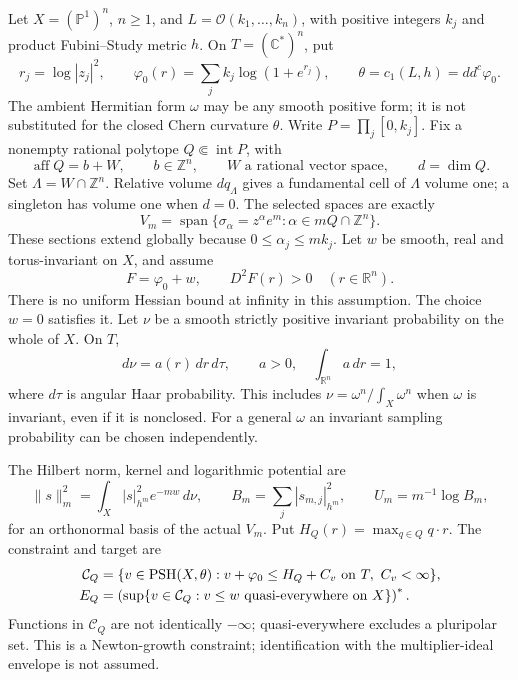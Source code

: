 \documentclass[11pt]{article}
\newcommand{\ddc}{dd^c}
\newcommand{\C}{\mathbb C}
\newcommand{\R}{\mathbb R}
\newcommand{\Z}{\mathbb Z}
\newcommand{\PSH}{\operatorname{PSH}}
\begin{document}
Let $X=(\mathbb P^1)^n$, $n\geq1$, and
$L=\mathcal O(k_1,\ldots,k_n)$, with positive integers $k_j$ and product
Fubini--Study metric $h$. On $T=(\C^*)^n$, put
\[
 r_j=\log|z_j|^2,\qquad
 \varphi_0(r)=\sum_jk_j\log(1+e^{r_j}),\qquad
 \theta=c_1(L,h)=\ddc\varphi_0.
\]
The ambient Hermitian form $\omega$ may be any smooth positive form;
it is not substituted for the closed Chern curvature $\theta$.
Write $P=\prod_j[0,k_j]$. Fix a nonempty rational polytope
$Q\Subset\operatorname{int}P$, with
\[
 \operatorname{aff}Q=b+W,\qquad b\in\Z^n,\qquad
 W\text{ a rational vector space},\qquad d=\dim Q.
\]
Set $\Lambda=W\cap\Z^n$. Relative volume $dq_\Lambda$ gives a
fundamental cell of $\Lambda$ volume one; a singleton has volume one
when $d=0$. The selected spaces are exactly
\begin{equation}\label{eq:spaces}
 V_m=\operatorname{span}\{\sigma_\alpha=z^\alpha e^m:
                   \alpha\in mQ\cap\Z^n\}.
\end{equation}
These sections extend globally because $0\leq\alpha_j\leq mk_j$.
Let $w$ be smooth, real and torus-invariant on $X$, and assume
\begin{equation}\label{eq:convex}
 F=\varphi_0+w,\qquad D^2F(r)>0\quad(r\in\R^n).
\end{equation}
There is no uniform Hessian bound at infinity in this assumption.
The choice $w=0$ satisfies it. Let $\nu$ be a smooth strictly positive
invariant probability on the whole of $X$. On $T$,
\[
 d\nu=a(r)\,dr\,d\tau,\qquad a>0,\quad
 \int_{\R^n}a\,dr=1,
\]
where $d\tau$ is angular Haar probability. This includes
$\nu=\omega^n/\int_X\omega^n$ when $\omega$ is invariant, even if
it is nonclosed. For a general $\omega$ an invariant sampling
probability can be chosen independently.

The Hilbert norm, kernel and logarithmic potential are
\[
 \|s\|_m^2=\int_X|s|_{h^m}^2e^{-mw}\,d\nu,\qquad
 B_m=\sum_j|s_{m,j}|_{h^m}^2,\qquad U_m=m^{-1}\log B_m,
\]
for an orthonormal basis of the actual $V_m$. Put
$H_Q(r)=\max_{q\in Q}q\cdot r$. The constraint and target are
\begin{align}
 \mathcal C_Q&=\{v\in\PSH(X,\theta):
        v+\varphi_0\leq H_Q+C_v\text{ on }T,\ C_v<\infty\},\notag\\
 E_Q&=\left(\sup\{v\in\mathcal C_Q:
                 v\leq w\text{ quasi-everywhere on }X\}\right)^*.
                 \label{eq:envelope}
\end{align}
Functions in $\mathcal C_Q$ are not identically $-\infty$;
quasi-everywhere excludes a pluripolar set. This is a Newton-growth
constraint; identification with the multiplier-ideal envelope is not
assumed.
\end{document}
